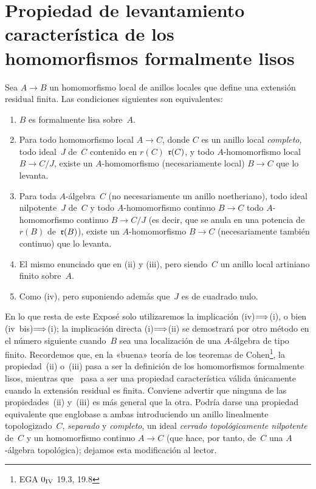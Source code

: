 
\section[Propiedad de levantamiento]{Propiedad de levantamiento característica de los homomorfismos formalmente lisos}
\label{III.2}

\begin{theoreme}
\label{III.2.1}
Sea $A\to B$ un homomorfismo local de anillos locales que define una extensión residual finita. Las condiciones siguientes son equivalentes:
\begin{enumerate}
\item[(i)]
$B$ es formalmente lisa sobre~$A$.
\item[(ii)] Para todo homomorfismo local $A\to C$, donde $C$ es un anillo local \emph{completo}, todo ideal~$J$ de~$C$ contenido en
{$r(C)$}
{$\mathfrak{r}(C)$},
y todo $A$-homomorfismo local $B\to C/J$, existe un $A$-homomorfismo (necesariamente local) $B\to C$ que lo levanta.
\item[(iii)] Para toda $A$-álgebra~$C$ (no necesariamente un anillo noetheriano), todo ideal nilpotente~$J$ de~$C$ y
{todo $A$-homomorfismo continuo $B\to C$}
{todo $A$-homomorfismo continuo $B\to C/J$}
(es decir, que se anula en una potencia
{de~$r(B)$}
{de~$\mathfrak{r}(B)$}),
existe un $A$-homomorfismo $B\to C$ (necesariamente también continuo) que lo levanta.
\item[(iv)] El mismo enunciado que en \textup{(ii)} y \textup{(iii)}, pero siendo~$C$ un anillo local artiniano finito sobre~$A$.
\item[(iv~bis)] Como \textup{(iv)}, pero suponiendo además que~$J$ es de cuadrado nulo.
\end{enumerate}
\end{theoreme}

\begin{remarquestar}
En lo que resta de este Exposé solo utilizaremos la implicación (iv)$\Longrightarrow$(i), o bien (iv~bis)$\Longrightarrow$(i); la implicación directa (i)$\Longrightarrow$(ii) se demostrará por otro método en el número siguiente cuando~$B$ sea una localización de una $A$-álgebra de tipo finito. Recordemos que, en la «buena» teoría de los teoremas de Cohen\footnote{\Cf EGA $\mathrm{0}_{\textup{IV}}$ 19.3, 19.8}, la propiedad~(ii) o~(iii) pasa a ser la definición de los homomorfismos formalmente lisos, mientras que~ pasa a ser una propiedad característica válida únicamente cuando la extensión residual es finita. Conviene advertir que ninguna de las propiedades~(ii) y~(iii) es más general que la otra. Podría darse una propiedad equivalente que englobase a ambas introduciendo un anillo linealmente topologizado~$C$, \emph{separado} y \emph{completo}, un ideal \emph{cerrado topológicamente nilpotente} de~$C$ y un homomorfismo continuo $A\to C$ (que hace, por tanto, de~$C$ una $A$-álgebra topológica); dejamos esta modificación al lector.
\end{remarquestar}

